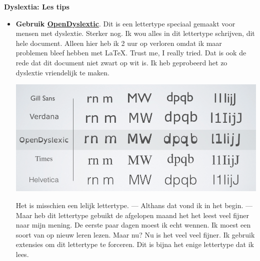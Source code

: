                     
                \bigskip
                \noindent\textbf{Dyslextia: Les tips}
                    \begin{itemize}
                        \item{\textbf{Gebruik \hyperlink{https://opendyslexic.org/}{OpenDyslextic}}. 
                            Dit is een lettertype speciaal gemaakt voor mensen met dyslextie. Sterker nog. Ik wou alles in dit lettertype schrijven, dit hele document. Alleen hier heb ik 2 uur op verloren omdat ik maar problemen bleef hebben met \LaTeX. Trust me, I really tried. Dat is ook de rede dat dit document niet zwart op wit is. Ik heb geprobeerd het zo dyslextie vriendelijk te maken. 
                            
                            \bigskip
                            
                            \begin{center}
                                \includegraphics[width=35em]{Eindopdracht-Tygo-van-den-Hurk-1705709/Resources/Images/open-dyslexic-abelardo-gonzalez-font-character-map.png}
                            \end{center}
                            
                            \bigskip
                            
                            \noindent Het is misschien een lelijk lettertype. — Althans dat vond ik in het begin. — Maar heb dit lettertype gebuikt de afgelopen maand het het leest veel fijner naar mijn mening. De eerste paar dagen moest ik echt wennen. Ik moest een soort van op nieuw leren lezen. Maar nu? Nu is het veel veel fijner. Ik gebruik extensies om dit lettertype te forceren. Dit is bijna het enige lettertype dat ik lees.
                            
                            \bigskip
                            
}
\end{itemize}
